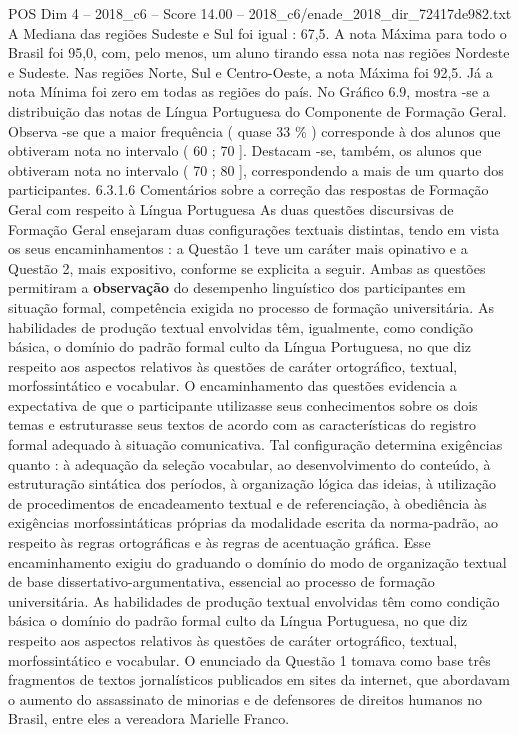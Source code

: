 \begin{textsample}{POS Dim 4 – 2018\_c6 – Score 14.00 – 2018\_c6/enade\_2018\_dir\_72417de982.txt}
A Mediana das regiões Sudeste e Sul foi igual : 67,5.
A nota Máxima para todo o Brasil foi 95,0, com, pelo menos, um aluno tirando essa nota nas regiões Nordeste e Sudeste.
Nas regiões Norte, Sul e Centro-Oeste, a nota Máxima foi 92,5.
Já a nota Mínima foi zero em todas as regiões do país.
No Gráfico 6.9, mostra -se a distribuição das notas de Língua Portuguesa do Componente de Formação Geral.
Observa -se que a maior frequência ( quase 33 \% ) corresponde à dos alunos que obtiveram nota no intervalo ( 60 ; 70 ].
Destacam -se, também, os alunos que obtiveram nota no intervalo ( 70 ; 80 ], correspondendo a mais de um quarto dos participantes. 6.3.1.6 Comentários sobre a correção das respostas de Formação Geral com respeito à Língua Portuguesa As duas questões discursivas de Formação Geral ensejaram duas configurações textuais distintas, tendo em vista os seus encaminhamentos : a Questão 1 teve um caráter mais opinativo e a Questão 2, mais expositivo, conforme se explicita a seguir.
Ambas as questões permitiram a \textbf{observação} do desempenho linguístico dos participantes em situação formal, competência exigida no processo de formação universitária.
As habilidades de produção textual envolvidas têm, igualmente, como condição básica, o domínio do padrão formal culto da Língua Portuguesa, no que diz respeito aos aspectos relativos às questões de caráter ortográfico, textual, morfossintático e vocabular.
O encaminhamento das questões evidencia a expectativa de que o participante utilizasse seus conhecimentos sobre os dois temas e estruturasse seus textos de acordo com as características do registro formal adequado à situação comunicativa.
Tal configuração determina exigências quanto : à adequação da seleção vocabular, ao desenvolvimento do conteúdo, à estruturação sintática dos períodos, à organização lógica das ideias, à utilização de procedimentos de encadeamento textual e de referenciação, à obediência às exigências morfossintáticas próprias da modalidade escrita da norma-padrão, ao respeito às regras ortográficas e às regras de acentuação gráfica.
Esse encaminhamento exigiu do graduando o domínio do modo de organização textual de base dissertativo-argumentativa, essencial ao processo de formação universitária.
As habilidades de produção textual envolvidas têm como condição básica o domínio do padrão formal culto da Língua Portuguesa, no que diz respeito aos aspectos relativos às questões de caráter ortográfico, textual, morfossintático e vocabular.
O enunciado da Questão 1 tomava como base três fragmentos de textos jornalísticos publicados em sites da internet, que abordavam o aumento do assassinato de minorias e de defensores de direitos humanos no Brasil, entre eles a vereadora Marielle Franco.

\end{textsample}
